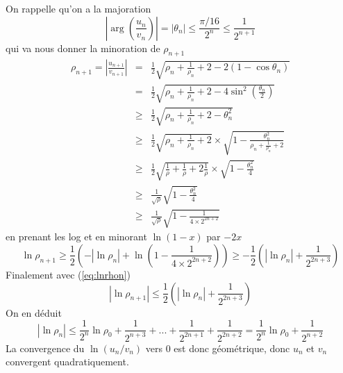\documentclass[a4paper,11pt]{article}
\begin{document}
\begin{giacjshere}
\begin{equation}
\end{equation}
On rappelle qu'on a la majoration 
\[ |\arg(\frac{u_n}{v_n})| = |\theta_n| \leq \frac{\pi/16}{2^n} \leq \frac{1}{2^{n+1}} \]
qui va nous donner la minoration de $\rho_{n+1}$ 
\begin{eqnarray*}
\rho_{n+1}=|\frac{u_{n+1}}{v_{n+1}}| & = & \frac{1}{2}
\sqrt{ \rho_n+ \frac{1}{\rho_n} +2 - 2 (1-\cos \theta_n) } \\
& = &  \frac{1}{2} \sqrt{ \rho_n+ \frac{1}{\rho_n} +2 - 4 \sin^2 (\frac{\theta_n}{2}) } \\
& \geq &  \frac{1}{2} \sqrt{ \rho_n+ \frac{1}{\rho_n} +2 - \theta_n^2} \\
& \geq &  \frac{1}{2} \sqrt{ \rho_n+ \frac{1}{\rho_n} +2} \times 
\sqrt{1 - \frac{\theta_n^2}{\rho_n+ \frac{1}{\rho_n} +2}} \\
& \geq &  \frac{1}{2} \sqrt{ \frac{1}{\rho} + \frac{1}{\rho} +2\frac{1}{\rho}} \times 
\sqrt{1 - \frac{\theta_n^2}{4}} \\
& \geq & \frac{1}{\sqrt{\rho}} \sqrt{1 - \frac{\theta_n^2}{4}} \\
& \geq & \frac{1}{\sqrt{\rho}} \sqrt{1 - \frac{1} {4 \times 2^{2n+2}}}
\end{eqnarray*}
en prenant les log et en minorant $\ln(1-x)$ par $-2x$
\[ \ln \rho_{n+1} \geq \frac{1}{2} (-|\ln \rho_n|+\ln(1 -\frac{1} {4 \times 2^{2n+2}} ))
\geq -\frac{1}{2} (|\ln \rho_n|+\frac{1} {2^{2n+3}} )  \]
Finalement avec (\ref{eq:lnrhon})
\[ |\ln \rho_{n+1}|
\leq \frac{1}{2} (|\ln \rho_n|+\frac{1}{2^{2n+3}} ) \]
On en déduit
\[ |\ln \rho_n| \leq \frac{1}{2^n} \ln \rho_0 + \frac{1}{2^{n+3}} + ... +
\frac{1}{2^{2n+1}} +  \frac{1}{2^{2n+2}}
= \frac{1}{2^n} \ln \rho_0 + \frac{1}{2^{n+2}} \]
La convergence du $\ln(u_n/v_n)$ vers 0 est donc géométrique, donc $u_n$ et $v_n$ convergent
quadratiquement.


\end{giacjshere}
\end{document}
